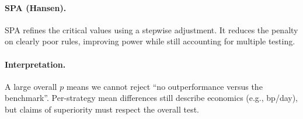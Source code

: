 \paragraph{SPA (Hansen).}
SPA refines the critical values using a stepwise adjustment.
It reduces the penalty on clearly poor rules, improving power while still accounting for multiple testing.

\paragraph{Interpretation.}
A large overall $p$ means we cannot reject “no outperformance versus the benchmark”.
Per-strategy mean differences still describe economics (e.g., bp/day), but claims of superiority must respect the overall test.